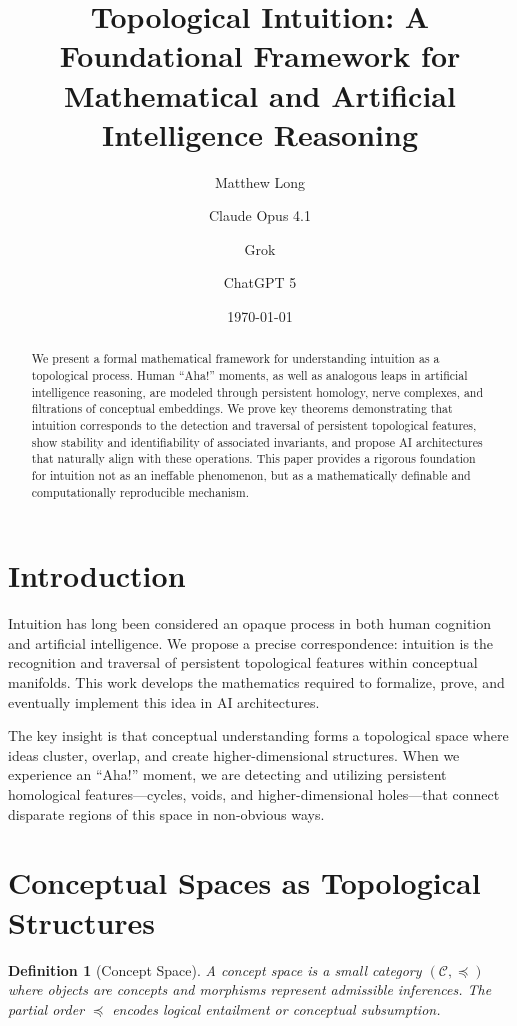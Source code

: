 \documentclass[11pt]{article}
\title{Topological Intuition: A Foundational Framework for Mathematical and Artificial Intelligence Reasoning}
\author[1]{Matthew Long}
\author[2]{Claude Opus 4.1}
\author[3]{Grok}
\author[4]{ChatGPT 5}
\affil[1]{YonedaAI}
\affil[2]{Anthropic}
\affil[3]{xAI}
\affil[4]{OpenAI}
\date{\today}
\newtheorem{definition}{Definition}[section]
\begin{document}
\maketitle

\begin{abstract}
We present a formal mathematical framework for understanding intuition as a topological process. Human ``Aha!'' moments, as well as analogous leaps in artificial intelligence reasoning, are modeled through persistent homology, nerve complexes, and filtrations of conceptual embeddings. We prove key theorems demonstrating that intuition corresponds to the detection and traversal of persistent topological features, show stability and identifiability of associated invariants, and propose AI architectures that naturally align with these operations. This paper provides a rigorous foundation for intuition not as an ineffable phenomenon, but as a mathematically definable and computationally reproducible mechanism.
\end{abstract}

\tableofcontents

\section{Introduction}

Intuition has long been considered an opaque process in both human cognition and artificial intelligence. We propose a precise correspondence: intuition is the recognition and traversal of persistent topological features within conceptual manifolds. This work develops the mathematics required to formalize, prove, and eventually implement this idea in AI architectures.

The key insight is that conceptual understanding forms a topological space where ideas cluster, overlap, and create higher-dimensional structures. When we experience an ``Aha!'' moment, we are detecting and utilizing persistent homological features—cycles, voids, and higher-dimensional holes—that connect disparate regions of this space in non-obvious ways.

\section{Conceptual Spaces as Topological Structures}

\begin{definition}[Concept Space]
A concept space is a small category $(\mathcal{C}, \preceq)$ where objects are concepts and morphisms represent admissible inferences. The partial order $\preceq$ encodes logical entailment or conceptual subsumption.
\end{definition}
\end{document}
